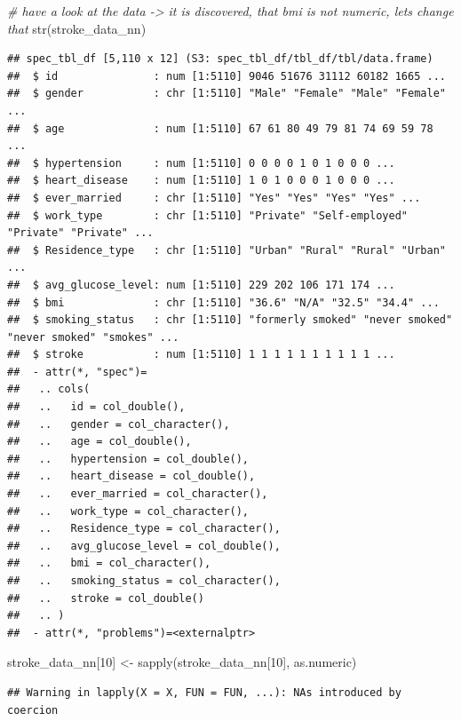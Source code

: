 \documentclass[
]{article}
\newenvironment{Shaded}{\begin{snugshade}}{\end{snugshade}}
\newcommand{\CommentTok}[1]{\textcolor[rgb]{0.56,0.35,0.01}{\textit{#1}}}
\newcommand{\DecValTok}[1]{\textcolor[rgb]{0.00,0.00,0.81}{#1}}
\newcommand{\FunctionTok}[1]{\textcolor[rgb]{0.00,0.00,0.00}{#1}}
\newcommand{\NormalTok}[1]{#1}
\newcommand{\OtherTok}[1]{\textcolor[rgb]{0.56,0.35,0.01}{#1}}
\renewcommand{\=}[1]{\stackrel{#1}{=}}
\theoremstyle{definition}
\theoremstyle{remark}
\begin{document}
\begin{Shaded}
\begin{Highlighting}[]
\CommentTok{\# have a look at the data {-}\textgreater{} it is discovered, that bmi is not numeric, let\textquotesingle{}s change that}
\FunctionTok{str}\NormalTok{(stroke\_data\_nn)}
\end{Highlighting}
\end{Shaded}

\begin{verbatim}
## spec_tbl_df [5,110 x 12] (S3: spec_tbl_df/tbl_df/tbl/data.frame)
##  $ id               : num [1:5110] 9046 51676 31112 60182 1665 ...
##  $ gender           : chr [1:5110] "Male" "Female" "Male" "Female" ...
##  $ age              : num [1:5110] 67 61 80 49 79 81 74 69 59 78 ...
##  $ hypertension     : num [1:5110] 0 0 0 0 1 0 1 0 0 0 ...
##  $ heart_disease    : num [1:5110] 1 0 1 0 0 0 1 0 0 0 ...
##  $ ever_married     : chr [1:5110] "Yes" "Yes" "Yes" "Yes" ...
##  $ work_type        : chr [1:5110] "Private" "Self-employed" "Private" "Private" ...
##  $ Residence_type   : chr [1:5110] "Urban" "Rural" "Rural" "Urban" ...
##  $ avg_glucose_level: num [1:5110] 229 202 106 171 174 ...
##  $ bmi              : chr [1:5110] "36.6" "N/A" "32.5" "34.4" ...
##  $ smoking_status   : chr [1:5110] "formerly smoked" "never smoked" "never smoked" "smokes" ...
##  $ stroke           : num [1:5110] 1 1 1 1 1 1 1 1 1 1 ...
##  - attr(*, "spec")=
##   .. cols(
##   ..   id = col_double(),
##   ..   gender = col_character(),
##   ..   age = col_double(),
##   ..   hypertension = col_double(),
##   ..   heart_disease = col_double(),
##   ..   ever_married = col_character(),
##   ..   work_type = col_character(),
##   ..   Residence_type = col_character(),
##   ..   avg_glucose_level = col_double(),
##   ..   bmi = col_character(),
##   ..   smoking_status = col_character(),
##   ..   stroke = col_double()
##   .. )
##  - attr(*, "problems")=<externalptr>
\end{verbatim}

\begin{Shaded}
\begin{Highlighting}[]
\NormalTok{stroke\_data\_nn[}\DecValTok{10}\NormalTok{] }\OtherTok{\textless{}{-}} \FunctionTok{sapply}\NormalTok{(stroke\_data\_nn[}\DecValTok{10}\NormalTok{], as.numeric)}
\end{Highlighting}
\end{Shaded}

\begin{verbatim}
## Warning in lapply(X = X, FUN = FUN, ...): NAs introduced by coercion
\end{verbatim}
\end{document}
